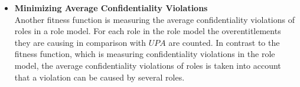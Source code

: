\begin{itemize}
            \item \textbf{Minimizing Average Confidentiality Violations}\\
            Another fitness function is measuring the average confidentiality violations of roles in a role model. For each role in the role model the overentitlements they are causing in comparison with $UPA$ are counted. In contrast to the fitness function, which is measuring confidentiality violations in the role model, the average confidentiality violations of roles is taken into account that a violation can be caused by several roles.

        \end{itemize}
